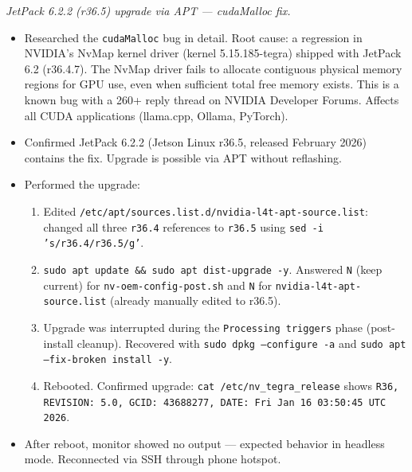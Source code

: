 \documentclass{article}
\theoremstyle{plain}
\theoremstyle{definition}
\theoremstyle{remark}
\begin{document}
\textit{JetPack 6.2.2 (r36.5) upgrade via APT --- cudaMalloc fix.}
\begin{itemize}
\item Researched the \texttt{cudaMalloc} bug in detail. Root cause: a regression in NVIDIA's NvMap kernel driver (kernel 5.15.185-tegra) shipped with JetPack 6.2 (r36.4.7). The NvMap driver fails to allocate contiguous physical memory regions for GPU use, even when sufficient total free memory exists. This is a known bug with a 260+ reply thread on NVIDIA Developer Forums. Affects all CUDA applications (llama.cpp, Ollama, PyTorch).
\item Confirmed JetPack 6.2.2 (Jetson Linux r36.5, released February 2026) contains the fix. Upgrade is possible via APT without reflashing.
\item Performed the upgrade:
  \begin{enumerate}
  \item Edited \texttt{/etc/apt/sources.list.d/nvidia-l4t-apt-source.list}: changed all three \texttt{r36.4} references to \texttt{r36.5} using \texttt{sed -i 's/r36.4/r36.5/g'}.
  \item \texttt{sudo apt update \&\& sudo apt dist-upgrade -y}. Answered \texttt{N} (keep current) for \texttt{nv-oem-config-post.sh} and \texttt{N} for \texttt{nvidia-l4t-apt-source.list} (already manually edited to r36.5).
  \item Upgrade was interrupted during the \texttt{Processing triggers} phase (post-install cleanup). Recovered with \texttt{sudo dpkg --configure -a} and \texttt{sudo apt --fix-broken install -y}.
  \item Rebooted. Confirmed upgrade: \texttt{cat /etc/nv\_tegra\_release} shows \texttt{R36, REVISION: 5.0, GCID: 43688277, DATE: Fri Jan 16 03:50:45 UTC 2026}.
  \end{enumerate}
\item After reboot, monitor showed no output --- expected behavior in headless mode. Reconnected via SSH through phone hotspot.
\end{itemize}
\end{document}
